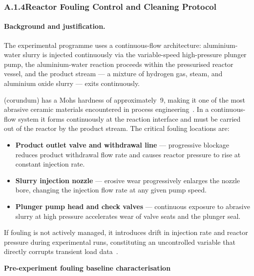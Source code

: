 \documentclass[12pt]{article}
\begin{document}
\subsubsection*{A.1.4\quad Reactor Fouling Control and Cleaning Protocol}

\paragraph{Background and justification.}

The experimental programme uses a continuous-flow architecture: aluminium-water
slurry is injected continuously via the variable-speed high-pressure plunger pump,
the aluminium-water reaction proceeds within the pressurised reactor vessel, and the
product stream --- a mixture of hydrogen gas, steam, and aluminium oxide slurry ---
exits continuously.

 (corundum) has a Mohs hardness of approximately~9, making it one of the
most abrasive ceramic materials encountered in process
engineering~\cite{finnie1960}. In a continuous-flow system it forms continuously at
the reaction interface and must be carried out of the reactor by the product stream.
The critical fouling locations are:

\begin{itemize}[itemsep=4pt]
    \item \textbf{Product outlet valve and withdrawal line} --- progressive
          blockage reduces product withdrawal flow rate and causes reactor pressure
          to rise at constant injection rate.
    \item \textbf{Slurry injection nozzle} --- erosive wear progressively
          enlarges the nozzle bore, changing the injection flow rate at any given
          pump speed.
    \item \textbf{Plunger pump head and check valves} --- continuous exposure to
          abrasive slurry at high pressure accelerates wear of valve seats and the
          plunger seal.
\end{itemize}

If fouling is not actively managed, it introduces drift in injection rate and reactor
pressure during experimental runs, constituting an uncontrolled variable that
directly corrupts transient load data~\cite{levenspiel1999}.

\bigskip
\noindent\textbf{Pre-experiment fouling baseline characterisation}
\end{document}

